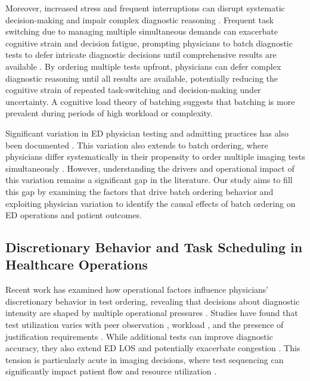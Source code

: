 \documentclass[,,nonblindrev]{informs}
\begin{document}
Moreover, increased stress and frequent interruptions can disrupt
systematic decision-making and impair complex diagnostic reasoning
\citep[\citet{bendoly2011linking}]{chisholm2000emergency}. Frequent task
switching due to managing multiple simultaneous demands can exacerbate
cognitive strain and decision fatigue, prompting physicians to batch
diagnostic tests to defer intricate diagnostic decisions until
comprehensive results are available \citep[\citet{skaugset2016can},
\citet{jaeker2020value}]{kc2013does}. By ordering multiple tests
upfront, physicians can defer complex diagnostic reasoning until all
results are available, potentially reducing the cognitive strain of
repeated task-switching and decision-making under uncertainty. A
cognitive load theory of batching suggests that batching is more
prevalent during periods of high workload or complexity.

Significant variation in ED physician testing and admitting practices
has also been documented \citep[\citet{Coussens2024},
\citet{Smulowitz2021}]{hodgson2018are}. This variation also extends to
batch ordering, where physicians differ systematically in their
propensity to order multiple imaging tests simultaneously
\citep{jameson2024variation}. However, understanding the drivers and
operational impact of this variation remains a significant gap in the
literature. Our study aims to fill this gap by examining the factors
that drive batch ordering behavior and exploiting physician variation to
identify the causal effects of batch ordering on ED operations and
patient outcomes.

\subsection{Discretionary Behavior and Task Scheduling in Healthcare
Operations}\label{discretionary-behavior-and-task-scheduling-in-healthcare-operations}

Recent work has examined how operational factors influence physicians'
discretionary behavior in test ordering, revealing that decisions about
diagnostic intensity are shaped by multiple operational pressures
\citep{soltani2022does}. Studies have found that test utilization varies
with peer observation \citep{song2017closing}, workload \citep{Deo2019},
and the presence of justification requirements \citep{jaeker2020value}.
While additional tests can improve diagnostic accuracy, they also extend
ED LOS and potentially exacerbate congestion \citep{chan2018efficiency}.
This tension is particularly acute in imaging decisions, where test
sequencing can significantly impact patient flow and resource
utilization \citep{Cournane2016}.
\end{document}
